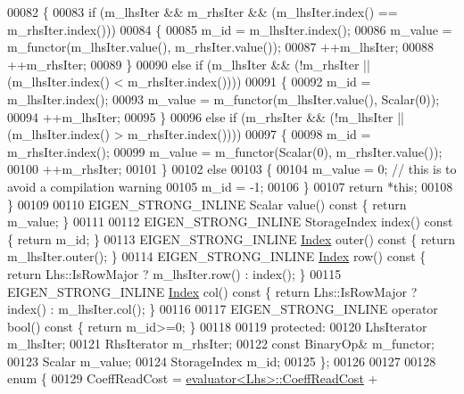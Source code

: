\begin{DoxyCode}
00082     \{
00083       \textcolor{keywordflow}{if} (m\_lhsIter && m\_rhsIter && (m\_lhsIter.index() == m\_rhsIter.index()))
00084       \{
00085         m\_id = m\_lhsIter.index();
00086         m\_value = m\_functor(m\_lhsIter.value(), m\_rhsIter.value());
00087         ++m\_lhsIter;
00088         ++m\_rhsIter;
00089       \}
00090       \textcolor{keywordflow}{else} \textcolor{keywordflow}{if} (m\_lhsIter && (!m\_rhsIter || (m\_lhsIter.index() < m\_rhsIter.index())))
00091       \{
00092         m\_id = m\_lhsIter.index();
00093         m\_value = m\_functor(m\_lhsIter.value(), Scalar(0));
00094         ++m\_lhsIter;
00095       \}
00096       \textcolor{keywordflow}{else} \textcolor{keywordflow}{if} (m\_rhsIter && (!m\_lhsIter || (m\_lhsIter.index() > m\_rhsIter.index())))
00097       \{
00098         m\_id = m\_rhsIter.index();
00099         m\_value = m\_functor(Scalar(0), m\_rhsIter.value());
00100         ++m\_rhsIter;
00101       \}
00102       \textcolor{keywordflow}{else}
00103       \{
00104         m\_value = 0; \textcolor{comment}{// this is to avoid a compilation warning}
00105         m\_id = -1;
00106       \}
00107       \textcolor{keywordflow}{return} *\textcolor{keyword}{this};
00108     \}
00109 
00110     EIGEN\_STRONG\_INLINE Scalar value()\textcolor{keyword}{ const }\{ \textcolor{keywordflow}{return} m\_value; \}
00111 
00112     EIGEN\_STRONG\_INLINE StorageIndex index()\textcolor{keyword}{ const }\{ \textcolor{keywordflow}{return} m\_id; \}
00113     EIGEN\_STRONG\_INLINE \hyperlink{namespace_eigen_a62e77e0933482dafde8fe197d9a2cfde}{Index} outer()\textcolor{keyword}{ const }\{ \textcolor{keywordflow}{return} m\_lhsIter.outer(); \}
00114     EIGEN\_STRONG\_INLINE \hyperlink{namespace_eigen_a62e77e0933482dafde8fe197d9a2cfde}{Index} row()\textcolor{keyword}{ const }\{ \textcolor{keywordflow}{return} Lhs::IsRowMajor ? m\_lhsIter.row() : index(); \}
00115     EIGEN\_STRONG\_INLINE \hyperlink{namespace_eigen_a62e77e0933482dafde8fe197d9a2cfde}{Index} col()\textcolor{keyword}{ const }\{ \textcolor{keywordflow}{return} Lhs::IsRowMajor ? index() : m\_lhsIter.col(); \}
00116 
00117     EIGEN\_STRONG\_INLINE \textcolor{keyword}{operator} bool()\textcolor{keyword}{ const }\{ \textcolor{keywordflow}{return} m\_id>=0; \}
00118 
00119   \textcolor{keyword}{protected}:
00120     LhsIterator m\_lhsIter;
00121     RhsIterator m\_rhsIter;
00122     \textcolor{keyword}{const} BinaryOp& m\_functor;
00123     Scalar m\_value;
00124     StorageIndex m\_id;
00125   \};
00126   
00127   
00128   \textcolor{keyword}{enum} \{
00129     CoeffReadCost = \hyperlink{struct_eigen_1_1internal_1_1evaluator}{evaluator<Lhs>::CoeffReadCost} + 

\end{DoxyCode}
